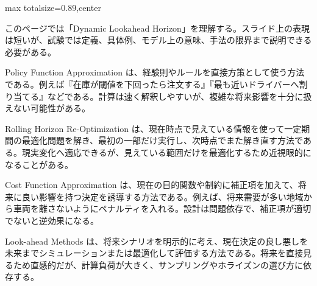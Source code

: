 \begin{minipage}[t]{0.58\textwidth}
\begin{adjustbox}{max totalsize={\textwidth}{0.89\textheight},center}
\begin{minipage}{\textwidth}\scriptsize
{}このページでは「Dynamic Lookahead Horizon」を理解する。スライド上の表現は短いが、試験では定義、具体例、モデル上の意味、手法の限界まで説明できる必要がある。\par
Policy Function Approximation は、経験則やルールを直接方策として使う方法である。例えば『在庫が閾値を下回ったら注文する』『最も近いドライバーへ割り当てる』などである。計算は速く解釈しやすいが、複雑な将来影響を十分に扱えない可能性がある。\par
Rolling Horizon Re-Optimization は、現在時点で見えている情報を使って一定期間の最適化問題を解き、最初の一部だけ実行し、次時点でまた解き直す方法である。現実変化へ適応できるが、見えている範囲だけを最適化するため近視眼的になることがある。\par
Cost Function Approximation は、現在の目的関数や制約に補正項を加えて、将来に良い影響を持つ決定を誘導する方法である。例えば、将来需要が多い地域から車両を離さないようにペナルティを入れる。設計は問題依存で、補正項が適切でないと逆効果になる。\par
Look-ahead Methods は、将来シナリオを明示的に考え、現在決定の良し悪しを未来までシミュレーションまたは最適化して評価する方法である。将来を直接見るため直感的だが、計算負荷が大きく、サンプリングやホライズンの選び方に依存する。\par

\end{minipage}
\end{adjustbox}
\end{minipage}
